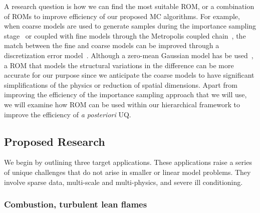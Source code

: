 \documentclass[11pt]{article}
\newcommand{\MarginPar}[1]{\marginpar{%
\vskip-\baselineskip %
\raggedright\tiny\sffamily
\hrule\smallskip{\color{red}#1}\par\smallskip\hrule}}
\begin{document}
A research question is how we can find the most suitable ROM, or a combination of ROMs to improve efficiency of our proposed MC algorithms.  
For example, when coarse models are used to generate samples
during the importance sampling stage~\cite{Bal:2013tp,Christen:2005wp,Efendiev:2007uw,Higdon:2002vx} or
coupled with fine models through the Metropolis coupled chain~\cite{Higdon:2002vx}, the match between the fine and coarse models can be improved through a discretization error model~\cite{Kaipio:2007ux}. Although a zero-mean Gaussian model has be used~\cite{Bal:2013tp}, a ROM that models the structural variations in the difference can be more accurate for our purpose since we anticipate the coarse models to have significant simplifications of the physics or reduction of spatial dimensions.  Apart from improving the efficiency of the importance sampling approach that we will use,  we will examine how ROM can be used within our hierarchical framework to
improve the efficiency of {\it {a posteriori}} UQ.

\subsection*{Proposed Research}

We begin by outlining three target applications.
These applications raise a series of unique challenges that do not arise in smaller or linear
model problems.
They involve sparse data, multi-scale and multi-physics, and severe ill conditioning.

\subsubsection*{Combustion, turbulent lean flames}
\end{document}
